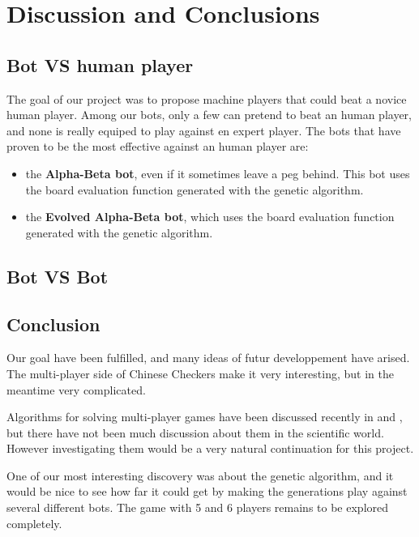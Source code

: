 \section{Discussion and Conclusions}
\subsection{Bot VS human player}
The goal of our project was to propose machine players that could beat a
novice human player. Among our bots, only a few can pretend to beat an human
player, and none is really equiped to play against en expert player. The bots
that have proven to be the most effective against an human player are:
\begin{itemize}
  \item the \textbf{Alpha-Beta bot}, even if it sometimes leave a peg behind.
        This bot uses the board evaluation function generated with the genetic
        algorithm.
  \item the \textbf{Evolved Alpha-Beta bot}, which uses the board evaluation
        function generated with the genetic algorithm.
\end{itemize}

\subsection{Bot VS Bot}

\subsection{Conclusion}
Our goal have been fulfilled, and many ideas of futur developpement have
arised. The multi-player side of Chinese Checkers make it very interesting,
but in the meantime very complicated.

Algorithms for solving multi-player games have been discussed recently in
\cite{Hashavit} and \cite{bestreplysearch}, but there have not been much
discussion about them in the scientific world. However investigating them
would be a very natural continuation for this project.

One of our most interesting discovery was about the genetic algorithm, and
it would be nice to see how far it could get by making the generations play
against several different bots. The game with 5 and 6 players remains to be
explored completely.

